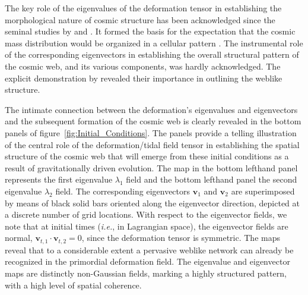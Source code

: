 \documentclass[a4paper, 11pt]{article}
\begin{document}
The key role of the eigenvalues of the deformation tensor in establishing the morphological nature of cosmic structure has been acknowledged since the seminal studies by \cite{Zeldovich:1970} and \cite{Doroshkevich:1970}. It formed the basis for the expectation that the cosmic mass distribution would be organized in a cellular pattern \cite[also see][]{Shandarin:1989,Shandarin:2009,sunyshand2014}. The instrumental role of the corresponding eigenvectors in establishing the overall structural pattern of the cosmic web, and its various components, was hardly acknowledged. The explicit demonstration by \cite{Feldbrugge:2018} revealed their importance in outlining the weblike structure.

The intimate connection between the deformation's eigenvalues and eigenvectors and the subsequent formation of the cosmic web is clearly revealed in the bottom panels of figure~\ref{fig:Initial_Conditions}. The panels provide a telling illustration of the central role of the deformation/tidal field tensor in establishing the spatial structure of the cosmic web that will emerge from these initial conditions as a result of gravitationally driven evolution. The map in the bottom lefthand panel represents the first eigenvalue $\lambda_1$ field and the bottom lefthand panel the second eigenvalue $\lambda_2$ field. The corresponding eigenvectors $\bm{v}_1$ and $\bm{v}_2$ are superimposed by means of black solid bars oriented along the eigenvector direction, depicted at a discrete number of grid locations. With respect to the eigenvector fields, we note that at initial times (\textit{i.e.}, in Lagrangian space), the eigenvector fields are normal, $\bm{v}_{t,1}\cdot \bm{v}_{t,2}=0$, since the deformation tensor is symmetric. The maps reveal that to a considerable extent a pervasive weblike network can already be recognized in the primordial deformation field. The eigenvalue and eigenvector maps are distinctly non-Gaussian fields, marking a highly structured pattern, with a high level of spatial coherence.
\end{document}

